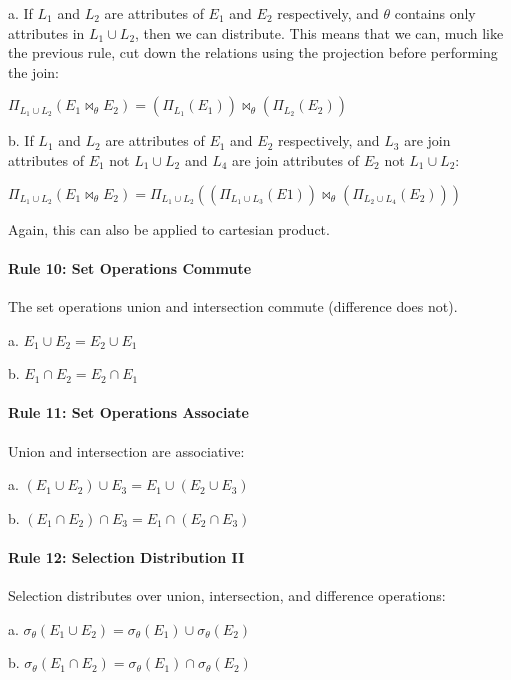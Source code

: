 \documentclass[a4paper]{report}
\begin{document}
a. If $L_{1}$ and $L_{2}$ are attributes of $E_{1}$ and $E_{2}$ respectively, and $\theta$ contains only attributes in $L_{1} \cup L_{2}$, then we can distribute. This means that we can, much like the previous rule, cut down the relations using the projection before performing the join:

$\Pi_{L_{1} \cup L_{2}}( E_{1} \bowtie_{\theta} E_{2} ) = (\Pi_{L_{1}}(E_{1})) \bowtie_{\theta} (\Pi_{L_{2}}(E_{2}))$

b. If $L_{1}$ and $L_{2}$ are attributes of $E_{1}$ and $E_{2}$ respectively, and $L_{3}$ are join attributes of $E_{1}$ not $L_{1} \cup L_{2}$ and $L_{4}$ are join attributes of $E_{2}$ not $L_{1} \cup L_{2}$:

$\Pi_{L_{1} \cup L_{2}} (E_{1} \bowtie_{\theta} E_{2}) = \Pi_{L_{1} \cup L_{2}}((\Pi_{L_{1} \cup L_{3}}(E1)) \bowtie_{\theta} (\Pi_{L_{2} \cup L_{4}}(E_{2})))$

Again, this can also be applied to cartesian product.

\paragraph{Rule 10: Set Operations Commute}

The set operations union and intersection commute  (difference does not).

a. $E_{1} \cup E_{2} = E_{2} \cup E_{1}$

b. $E_{1} \cap E_{2} = E_{2} \cap E_{1}$

\paragraph{Rule 11: Set Operations Associate}
Union and intersection are associative:

a. $(E_{1} \cup E_{2}) \cup E_{3} = E_{1} \cup (E_{2} \cup E_{3})$

b. $(E_{1} \cap E_{2}) \cap E_{3} = E_{1} \cap (E_{2} \cap E_{3})$

\paragraph{Rule 12: Selection Distribution II}

Selection distributes over union, intersection, and difference operations:

a. $\sigma_{\theta}(E_{1} \cup E_{2}) = \sigma_{\theta}(E_{1}) \cup \sigma_{\theta}(E_{2})$

b. $\sigma_{\theta}(E_{1} \cap E_{2}) = \sigma_{\theta}(E_{1}) \cap \sigma_{\theta}(E_{2})$
\end{document}
